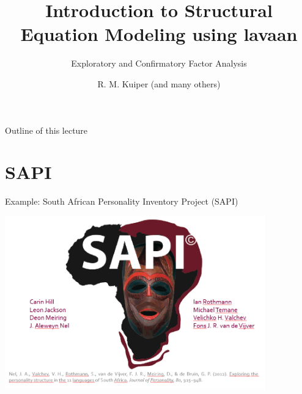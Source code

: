 \documentclass[10pt]{beamer}\usepackage[]{graphicx}\usepackage[]{xcolor}
\title{Introduction to Structural Equation Modeling using lavaan}
\subtitle{Exploratory and Confirmatory Factor Analysis}
\author{R. M. Kuiper (and many others)}
\institute{Department of Methodology \& Statistics \\ Utrecht University}
\date{}
\begin{document}

\begin{frame}[t, plain]
  \titlepage
\end{frame}

%
\begin{frame}{Outline of this lecture}
\tableofcontents[hidesubsections]
\end{frame}


\section{SAPI}
%
%
\begin{frame}{Example: South African Personality Inventory Project (SAPI)}
	
	\includegraphics[height=7.5cm,keepaspectratio=T] {SAPI.png}
	
\end{frame}
%
\end{document}
